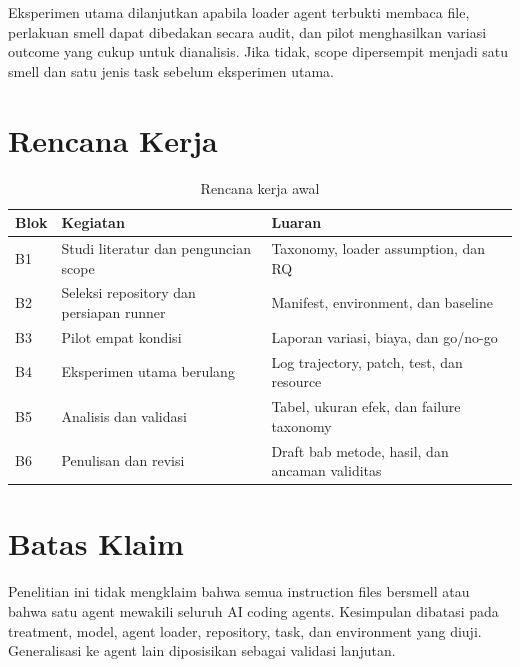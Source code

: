 Eksperimen utama dilanjutkan apabila loader agent terbukti membaca file, perlakuan smell dapat dibedakan secara audit, dan pilot menghasilkan variasi outcome yang cukup untuk dianalisis. Jika tidak, scope dipersempit menjadi satu smell dan satu jenis task sebelum eksperimen utama.

\section{Rencana Kerja}

\begin{table}[htbp]
\centering
\small
\caption{Rencana kerja awal}
\label{tab:schedule}
\begin{tabularx}{\textwidth}{p{1.1cm}p{4.2cm}Y}
\toprule
\textbf{Blok} & \textbf{Kegiatan} & \textbf{Luaran} \\
\midrule
B1 & Studi literatur dan penguncian scope & Taxonomy, loader assumption, dan RQ \\
B2 & Seleksi repository dan persiapan runner & Manifest, environment, dan baseline \\
B3 & Pilot empat kondisi & Laporan variasi, biaya, dan go/no-go \\
B4 & Eksperimen utama berulang & Log trajectory, patch, test, dan resource \\
B5 & Analisis dan validasi & Tabel, ukuran efek, dan failure taxonomy \\
B6 & Penulisan dan revisi & Draft bab metode, hasil, dan ancaman validitas \\
\bottomrule
\end{tabularx}
\end{table}

\section{Batas Klaim}

Penelitian ini tidak mengklaim bahwa semua instruction files bersmell atau bahwa satu agent mewakili seluruh AI coding agents. Kesimpulan dibatasi pada treatment, model, agent loader, repository, task, dan environment yang diuji. Generalisasi ke agent lain diposisikan sebagai validasi lanjutan.
